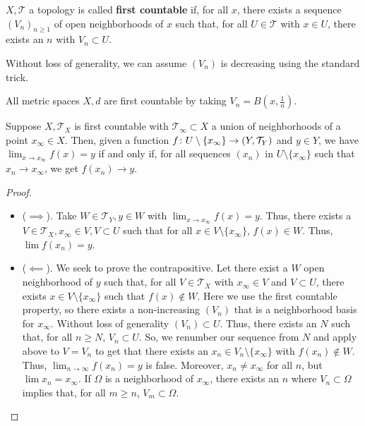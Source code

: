 \documentclass[11pt,leqno,oneside]{amsbook}
\numberwithin{thm}{section}
\newcommand{\Top}{\mathcal{T}} %
\renewcommand{\de}{\textbf} %
\begin{document}
\begin{defn}
  \(X,\Top\) a topology is called \de{first countable} if, for all
  \(x\), there exists a sequence \((V_n)_{n \geq 1}\) of open
  neighborhoods of \(x\) such that, for all \(U \in \Top\) with \(x
  \in U\), there exists an \(n\) with \(V_n \subset U\).
\end{defn}
Without loss of generality, we can assume \((V_n)\) is decreasing
using the standard trick.
\begin{example}
  All metric spaces \(X,d\) are first countable by taking \(V_n =
  B(x,\frac{1}{n})\).
\end{example}
\begin{prop}\label{seq-char-of-lims}
  Suppose \(X, \Top_X\) is first countable with \(\Top_\infty \subset
  X\) a union of neighborhoods of a point \(x_\infty \in X\). Then,
  given a function \(f \from U \setminus \{x_\infty\} \to (Y,
  \Top_Y)\) and \(y \in Y\), we have \(\lim_{x \to x_\infty} f(x) = y\)
  if and only if, for all sequences \((x_n)\) in \(U \setminus
  \{x_\infty\}\) such that \(x_n \to x_\infty\), we get \(f(x_n) \to y\).
\end{prop}
\begin{proof}
  \begin{itemize}
  \item (\(\implies\)). Take \(W \in \Top_Y, y \in W\) with \(\lim_{x
      \to x_\infty} f(x) = y\). Thus, there exists a \(V \in \Top_X,
    x_\infty \in V, V \subset U\) such that for all \(x \in V
    \setminus \{x_\infty\}\), \(f(x) \in W\). Thus, \(\lim f(x_n) =
    y\).
  \item (\(\impliedby\)). We seek to prove the contrapositive. Let
    there exist a \(W\) open neighborhood of \(y\) such that, for all
    \(V \in \Top_X\) with \(x_\infty \in V\) and \(V \subset U\),
    there exists \(x \in V \setminus \{x_\infty\}\) such that \(f(x)
    \not \in W\). Here we use the first countable property, so there
    exists a non-increasing \((V_n)\) that is a neighborhood basis for
    \(x_\infty\). Without loss of generality \((V_n) \subset
    U\). Thus, there exists an \(N\) such that, for all \(n \geq N\),
    \(V_n \subset U\). So, we renumber our sequence from \(N\) and
    apply above to \(V = V_n\) to get that there exists an \(x_n \in
    V_n \setminus \{x_\infty\}\) with \(f(x_n) \not \in W\). Thus,
    \(\lim_{n \to \infty} f(x_n) = y\) is false. Moreover, \(x_n \neq
    x_\infty\) for all \(n\), but \(\lim x_n = x_\infty\). If
    \(\Omega\) is a neighborhood of \(x_\infty\), there exists an
    \(n\) where \(V_n \subset \Omega\) implies that, for all \(m \geq
    n\), \(V_m \subset \Omega\).
  \end{itemize}
\end{proof}
\end{document}
